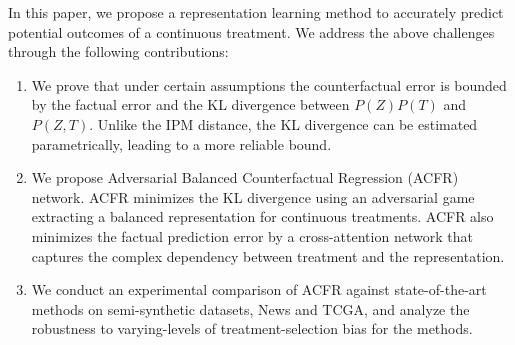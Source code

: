 \documentclass[letterpaper]{article} %
\begin{document}
\newline
\newline
In this paper,  we propose a representation learning method to accurately predict potential outcomes of a continuous treatment. We address the above challenges through the following contributions: 
\begin{enumerate}
  \item  We prove that under certain assumptions the counterfactual error is bounded by the factual error and the KL divergence between $P(Z)P(T)$ and $P(Z, T)$. Unlike the IPM distance, the KL divergence can be estimated parametrically, leading to a more reliable bound.
  \item 
  We propose Adversarial Balanced Counterfactual Regression (ACFR) network. ACFR minimizes the KL divergence using an adversarial game extracting a balanced representation for continuous treatments. ACFR also minimizes the factual prediction error by a cross-attention network that captures the complex dependency between treatment and the representation.
  \item 
  We conduct an experimental comparison of ACFR against state-of-the-art methods on semi-synthetic datasets, News and TCGA, and analyze the robustness to varying-levels of treatment-selection bias for the methods.
\end{enumerate}
\end{document}

